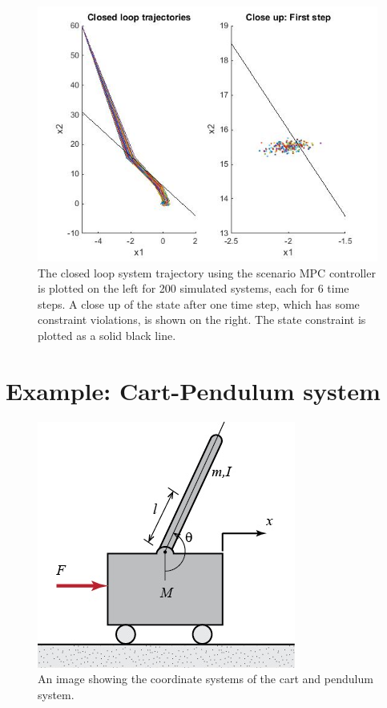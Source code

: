\documentclass[12 pt]{report}
\begin{document}
\begin{figure}
	\includegraphics[width=\linewidth]{SCMPC_200x6.jpg}
	\caption{The closed loop system trajectory using the scenario MPC controller is plotted on the left for 200 simulated systems, each for 6 time steps. A close up of the state after one time step, which has some constraint violations, is shown on the right. The state constraint is plotted as a solid black line.}
	\label{fig:SCMPC_200x6}
\end{figure}

\section{Example: Cart-Pendulum system}

\begin{figure}
	\includegraphics[width=\linewidth]{cart-pendulum.jpg}
	\caption{An image showing the coordinate systems of the cart and pendulum system.}
	\label{fig:cart-pendulum}
\end{figure}
\end{document}
